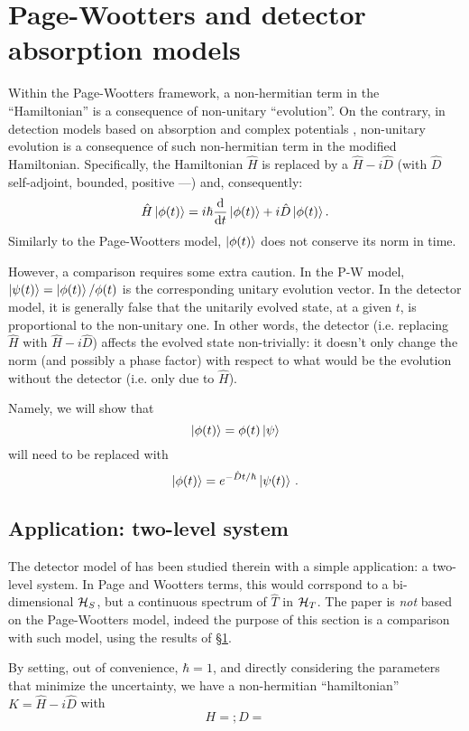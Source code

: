 \section{Page-Wootters and detector absorption models}\label{sec:absorption+pw}

Within the Page-Wootters framework, a non-hermitian term in the ``Hamiltonian''
is a consequence of non-unitary ``evolution''.
On the contrary, in detection models based on absorption and complex potentials
\parencite{RuschhauptAbsorption}, non-unitary evolution is a consequence
of such non-hermitian term in the modified Hamiltonian.
Specifically, the Hamiltonian $\hat{H}$ is replaced by a $\hat{H} - i\hat{D}$
(with $\hat{D}$ self-adjoint, bounded, positive ---\cite{RuschhauptAbsorption})
and, consequently:
\begin{equation}\label{eq:schrod_complex_pot}
  \hat{H} \ket{\phi(t)} = i\hbar\dv{t}\ket{\phi(t)} +i\hat{D}\ket{\phi(t)} \text{.}
\end{equation}
Similarly to the Page-Wootters model, $\ket{\phi(t)}$ does not conserve its norm in time.

However, a comparison requires some extra caution.
In the P-W model, $\ket{\psi(t)} = \ket{\phi(t)}/\phi(t)$
is the corresponding unitary evolution vector. In the detector model,
it is generally false
that the unitarily evolved state, at a given $t$, is proportional to
the non-unitary one. In other words,
the detector (i.e. replacing $\hat{H}$ with $\hat{H}-i\hat{D}$)
affects the evolved state non-trivially:
it doesn't only change the norm (and possibly a phase factor)
with respect to what would be the evolution without the detector
(i.e. only due to $\hat{H}$).

Namely, we will show that 
\[
  \ket{\phi(t)} = \phi(t) \ket{\psi}
\]
will need to be replaced with
\[
  \ket{\phi(t)} = e^{-\hat{D}t/\hbar}\ket{\psi(t)} \, \text{.}
\]



\subsection{Application: two-level system}

The detector model of \cite{RuschhauptAbsorption} has been studied therein
with a simple application: a two-level system. In Page and Wootters terms,
this would corrspond to a bi-dimensional $\mathcal{H}_S$, but a continuous
spectrum of $\hat{T}$ in $\mathcal{H}_T$. The paper is \emph{not} based on
the Page-Wootters model, indeed the purpose of this section is a comparison
with such model, using the results of \S \ref{sec:absorption+pw}.

By setting, out of convenience, $\hbar = 1$, and directly considering the parameters
that minimize the uncertainty, we have a non-hermitian ``hamiltonian''
$K = \hat{H} - i\hat{D}$ with
\begin{equation}
  H = ; D =
\end{equation}